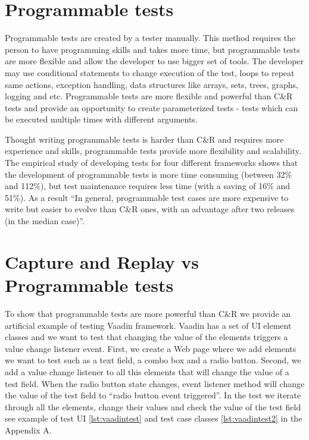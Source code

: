 \section{Programmable tests} 
\label{sec:programTests}
Programmable tests are created by a tester manually. This method requires the
person to have programming skills and takes more time, but programmable tests
are more flexible and allow the developer to use bigger set of tools. The
developer may use conditional statements to change execution of the test,
loops to repeat same actions, exception handling, data structures like
arrays, sets, trees, graphs, logging and etc. Programmable tests are more
flexible and powerful than C\&R tests and provide an opportunity to create
parameterized tests - tests which can be executed multiple times with different arguments. 

Thought writing programmable tests is harder than C\&R and requires more
 experience and skills, programmable tests provide more flexibility and scalability. The empirical study
       of developing tests for four different frameworks shows that the development of 
       programmable tests is more time
      consuming (between 32\% and 112\%), but test maintenance requires less
      time (with a saving of 16\% and 51\%). As a result ``In general, programmable test cases are more
      expensive to write but easier to evolve than C\&R ones, with an advantage
      after two releases (in the median case)''.\cite{CaptureReplay7}

 \section{Capture and Replay vs Programmable tests}
 To show that programmable tests are more powerful than C\&R we provide an
artificial example of testing Vaadin framework.	
Vaadin has a set of UI element classes and we want to	test that changing 
the value of the elements triggers a value change listener event.
First, we create a Web page where we add elements we
want to test such as a text field, a combo box and a radio button. Second, we
add a value change listener to all this elements that will change the value of a test field.
When the radio button state changes, event listener method
will change the value of the test field to ``radio button event triggered''. In the test we
iterate through all the elements, change their values and check the value
of the test field see example of test UI \ref{lst:vaadintest} and test case
classes \ref{lst:vaadintest2} in the Appendix A.

